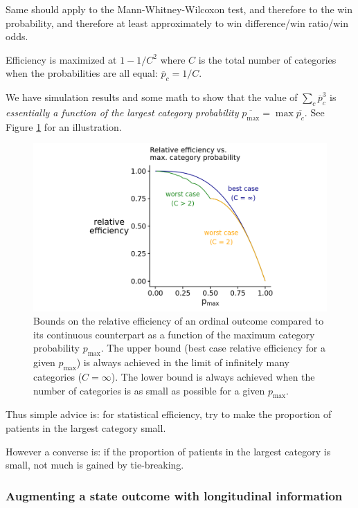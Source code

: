 \documentclass[
  11pt,
  fleqn
]{article}
\begin{document}
Same should apply to the Mann-Whitney-Wilcoxon test, and therefore to
the win probability, and therefore at least approximately to win
difference/win ratio/win odds.

Efficiency is maximized at $1 - 1/C^2$ where $C$ is the total number of
categories when the probabilities are all equal: $\overline p_c = 1/C$.

We have simulation results and some math to show that the value of $\sum_c
\overline p_c^3$ is \emph{essentially a function of the largest category
probability} $\overline{p_{\max}} = \max \overline{p_c}$. See Figure
\ref{fig:p_max} for an illustration.

\begin{figure}
  \includegraphics[width=6in]{p_max_controls_efficiency.png}
  \caption{Bounds on the relative efficiency of an ordinal outcome
    compared to its continuous counterpart as a function of the maximum
    category probability $p_\text{max}$. The upper bound (best case
    relative efficiency for a given $p_\text{max}$) is always achieved in the
    limit of infinitely many categories ($C = \infty$). The lower bound
    is always achieved when the number of categories is as small as
  possible for a given $p_\text{max}$.}
  \label{fig:p_max}
\end{figure}

Thus simple advice is: for statistical efficiency, try to make the proportion
of patients in the largest category small.

However a converse is: if the proportion of patients in the largest
category is
small, not much is gained by tie-breaking.

\subsubsection{Augmenting a state outcome with longitudinal
information}
\end{document}
